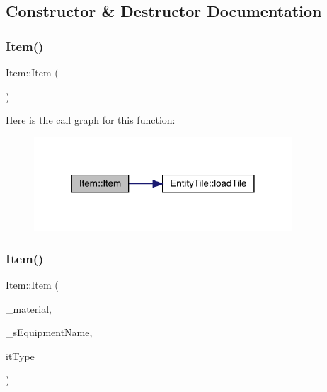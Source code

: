 \subsection{Constructor \& Destructor Documentation}
\mbox{\label{class_item_a297720c02984eab37332ae795d22189d}} 
\subsubsection{\texorpdfstring{Item()}{Item()}\hspace{0.1cm}{\footnotesize\ttfamily [1/3]}}
{\footnotesize\ttfamily Item\+::\+Item (\begin{DoxyParamCaption}{ }\end{DoxyParamCaption})}

Here is the call graph for this function\+:
\nopagebreak
\begin{figure}[H]
\begin{center}
\leavevmode
\includegraphics[width=273pt]{dc/d32/class_item_a297720c02984eab37332ae795d22189d_cgraph}
\end{center}
\end{figure}
\mbox{\label{class_item_a151feb15d24241570c89d776ac31aeb4}} 
\subsubsection{\texorpdfstring{Item()}{Item()}\hspace{0.1cm}{\footnotesize\ttfamily [2/3]}}
{\footnotesize\ttfamily Item\+::\+Item (\begin{DoxyParamCaption}\item[{\mbox{\hyperlink{class_material}{Material}}}]{\+\_\+material,  }\item[{std\+::string}]{\+\_\+s\+Equipment\+Name,  }\item[{\mbox{\hyperlink{_equipment_8hpp_a3c7fe24829a0b210a1a4d36e29ac01c6}{En\+Item\+Type}}}]{it\+Type }\end{DoxyParamCaption})}

